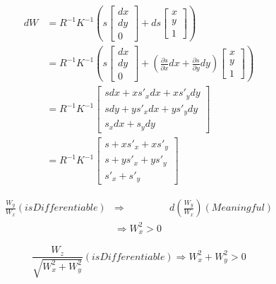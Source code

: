 \documentclass{ctexart}
\begin{document}
	\begin{equation}
	\begin{split}
	dW
	& = R^{-1} K^{-1} \left(
	s \begin{bmatrix} dx \\ dy \\ 0 \end{bmatrix}
	+
	ds \begin{bmatrix} x \\ y \\ 1 \end{bmatrix}
	\right)
	\\
	& = R^{-1} K^{-1} \left(
	s \begin{bmatrix} dx \\ dy \\ 0 \end{bmatrix}
	+
	\left(\frac{\partial s}{\partial x} dx + \frac{\partial s}{\partial y} dy\right) \begin{bmatrix} x \\ y \\ 1 \end{bmatrix}
	\right)
	\\
	& = R^{-1} K^{-1}
	\begin{bmatrix}
	s dx + x s'_x dx + x s'_y dy \\
	s dy + y s'_x dx + y s'_y dy \\
	s_x dx + s_y dy
	\end{bmatrix}
	\\
	& = R^{-1} K^{-1}
	\begin{bmatrix}
	s + x s'_x + x s'_y \\
	s + y s'_x + y s'_y \\
	s'_x + s'_y
	\end{bmatrix}
	\end{split}
	\end{equation}
	
	\begin{equation}
	\begin{aligned}
	\frac{W_y}{W_x} (is Differentiable) & \Rightarrow & d(\frac{W_y}{W_x})(Meaningful) \\
	& \Rightarrow W_x^2 > 0
	\end{aligned}
	\end{equation}
	
	\begin{equation}
	\frac{W_z}{\sqrt{W_x^2+W_y^2}} (is Differentiable) \Rightarrow W_x^2 + W_y^2 > 0
	\end{equation}
	
\end{document}
